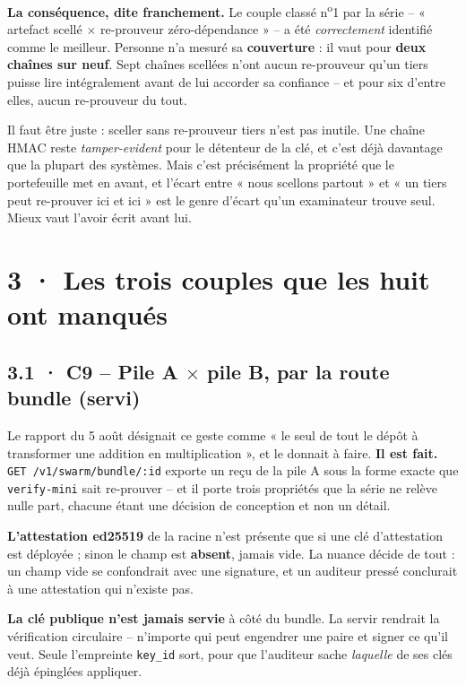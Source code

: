 \documentclass[10pt]{article}
\newcommand{\sz}[1]{{\small\color{grey}\textsf{#1}}}
\newcommand{\code}[1]{\texttt{\small #1}}
\newcommand{\x}{$\times$}
\begin{document}
\begin{alerte}
\textbf{La conséquence, dite franchement.} Le couple classé n\textsuperscript{o}1 par la série --
« artefact scellé \x{} re-prouveur zéro-dépendance » -- a été \emph{correctement} identifié comme le
meilleur. Personne n'a mesuré sa \textbf{couverture} : il vaut pour \textbf{deux chaînes sur neuf}. Sept
chaînes scellées n'ont aucun re-prouveur qu'un tiers puisse lire intégralement avant de lui accorder sa
confiance -- et pour six d'entre elles, aucun re-prouveur du tout.
\end{alerte}

Il faut être juste : sceller sans re-prouveur tiers n'est pas inutile. Une chaîne HMAC reste
\emph{tamper-evident} pour le détenteur de la clé, et c'est déjà davantage que la plupart des systèmes.
Mais c'est précisément la propriété que le portefeuille met en avant, et l'écart entre « nous scellons
partout » et « un tiers peut re-prouver ici et ici » est le genre d'écart qu'un examinateur trouve seul.
Mieux vaut l'avoir écrit avant lui.

\section{3 · Les trois couples que les huit ont manqués}

\subsection{3.1 · C9 -- Pile A \x{} pile B, par la route bundle \sz{(servi)}}

Le rapport du 5 août désignait ce geste comme « le seul de tout le dépôt à transformer une addition en
multiplication », et le donnait à faire. \textbf{Il est fait.} \code{GET /v1/swarm/bundle/:id} exporte un
reçu de la pile A sous la forme exacte que \code{verify-mini} sait re-prouver -- et il porte trois
propriétés que la série ne relève nulle part, chacune étant une décision de conception et non un détail.

\textbf{L'attestation ed25519} de la racine n'est présente que si une clé d'attestation est déployée ;
sinon le champ est \textbf{absent}, jamais vide. La nuance décide de tout : un champ vide se confondrait
avec une signature, et un auditeur pressé conclurait à une attestation qui n'existe pas.

\textbf{La clé publique n'est jamais servie} à côté du bundle. La servir rendrait la vérification
circulaire -- n'importe qui peut engendrer une paire et signer ce qu'il veut. Seule l'empreinte
\code{key\_id} sort, pour que l'auditeur sache \emph{laquelle} de ses clés déjà épinglées appliquer.
\end{document}
